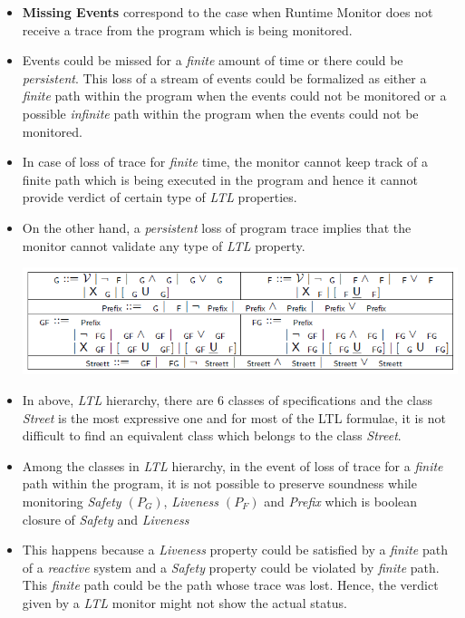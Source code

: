 \documentclass[]{article}
\begin{document}
	\begin{itemize}
	
	\item \textbf{Missing Events} correspond to the case when Runtime Monitor does not receive a trace from the program which is being monitored.
	
	\item Events could be missed for a \emph{finite} amount of time or there could be \emph{persistent}. This loss of a stream of events could be formalized as either a \emph{finite} path within the program when the events could not be monitored or a possible \emph{infinite} path within the program when the events could not be monitored.
	
	\item In case of loss of trace for \emph{finite} time, the monitor cannot keep track of a finite path which is being executed in the program and hence it cannot provide verdict of certain type of \emph{LTL} properties.
	
	\item On the other hand, a \emph{persistent} loss of program trace implies that the monitor cannot validate any type of \emph{LTL} property.
	
    \includegraphics[scale=0.4]{LTLHierarchy.png}
    
    \item In above, \emph{LTL} hierarchy, there are 6 classes of specifications and the class \emph{Street} is the most expressive one and for most of the LTL formulae, it is not difficult to find an equivalent class which belongs to the class \emph{Street}.
    
    	\item Among the classes in \emph{LTL} hierarchy, in the event of loss of trace for a \emph{finite} path within the program, it is not possible to preserve soundness while monitoring \emph{Safety $(P_G)$}, \emph{Liveness $(P_F)$} and \emph{Prefix} which is boolean closure of \emph{Safety} and \emph{Liveness}
    
    \item This happens because a \emph{Liveness} property could be satisfied by a \emph{finite} path of a \emph{reactive} system and a \emph{Safety} property could be violated by \emph{finite} path. This \emph{finite} path could be the path whose trace was lost. Hence, the verdict given by a \emph{LTL} monitor might not show the actual status.
    

\end{itemize}
\end{document}
